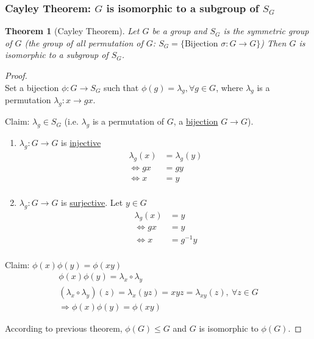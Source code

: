 \documentclass[11pt,a4paper]{article}
\newtheorem{theorem}{Theorem}
\begin{document}
\subsubsection{Cayley Theorem: $G$ is isomorphic to a subgroup of $S_G$}
\begin{theorem}[Cayley Theorem]
Let $G$ be a group and $S_G$ is the symmetric group of $G$ (the group of all permutation of $G$: $S_G=\{\text{Bijection } \sigma: G \rightarrow G\}$)
Then $G$ is isomorphic to a subgroup of $S_G$.
\end{theorem}
\begin{proof}
\quad\\
Set a bijection $\phi: G \rightarrow S_G$ such that $\phi(g)=\lambda_g, \forall g\in G$, where $\lambda_g$ is a permutation $\lambda_g: x \rightarrow gx$.

Claim: $\lambda_g\in S_G$ (i.e. $\lambda_g$ is a permutation of $G$, a \underline{bijection} $G \rightarrow	G$).
\begin{enumerate}
    \item $\lambda_g: G \rightarrow G$ is \underline{injective}
    \begin{equation}
        \begin{aligned}
            \lambda_g(x)&=\lambda_g(y)\\
            \Leftrightarrow	gx&=gy\\
            \Leftrightarrow	x&=y\\
        \end{aligned}
        \nonumber
    \end{equation}
    \item $\lambda_g: G \rightarrow G$ is \underline{surjective}. Let $y\in G$
    \begin{equation}
        \begin{aligned}
            \lambda_g(x)&=y\\
            \Leftrightarrow	gx&=y\\
            \Leftrightarrow	x&=g^{-1}y\\
        \end{aligned}
        \nonumber
    \end{equation}
\end{enumerate}


Claim: $\phi(x)\phi(y)=\phi(xy)$
\begin{equation}
    \begin{aligned}
        \phi(x)\phi(y)=\lambda_x\circ\lambda_y\\
        (\lambda_x\circ\lambda_y)(z)=\lambda_x(yz)=xyz=\lambda_{xy}(z),\ \forall z\in G\\
        \Rightarrow	\phi(x)\phi(y)=\phi(xy)
    \end{aligned}
    \nonumber
\end{equation}

According to previous theorem, $\phi(G)\leq G$ and $G$ is isomorphic to $\phi(G)$.

\end{proof}
\end{document}
